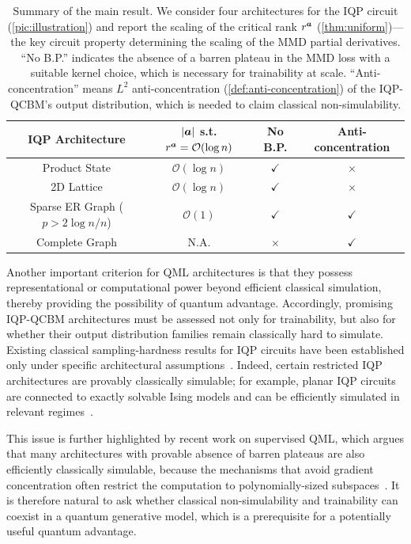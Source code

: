 \documentclass{article}
\theoremstyle{plain}
\theoremstyle{definition}
\theoremstyle{remark}
\begin{document}
\begin{table}
\centering
\caption{Summary of the main result. We consider four architectures for the IQP circuit (\cref{pic:illustration}) and report the scaling of the critical rank $r^{\bm{a}}$ (\cref{thm:uniform})---the key circuit property determining the scaling of the MMD partial derivatives. ``No B.P.'' indicates the absence of a barren plateau in the MMD loss with a suitable kernel choice, which is necessary for trainability at scale. ``Anti-concentration'' means $L^2$ anti-concentration (\cref{def:anti-concentration}) of the IQP-QCBM's output distribution, which is needed to claim classical non-simulability.}
\vspace{0.2cm}
\label{tab:examples-summary}
\begin{tabular}{cccc}
\toprule
IQP Architecture 
& $\abs{{\bm{a}}}$ s.t. $r^{\bm{a}} = \mathcal{O}(\log n)$
& No B.P.
& Anti-concentration \\
\midrule
Product State
& $\mathcal{O}(\log n)$
& $\checkmark$
& $\times$ \\

2D Lattice
& $\mathcal{O}(\log n)$
& $\checkmark$
& $\times$ \\

Sparse ER Graph ($p>2\log n /n$)
& $\mathcal{O}(1)$
& $\checkmark$
& $\checkmark$ \\

Complete Graph
& N.A.
& $\times$
& $\checkmark$ \\
\bottomrule
\end{tabular}
\vspace{-0.5cm}
\end{table}

Another important criterion for QML architectures is that they possess representational or computational power beyond efficient classical simulation, thereby providing the possibility of quantum advantage. Accordingly, promising IQP-QCBM architectures must be assessed not only for trainability, but also for whether their output distribution families remain classically hard to simulate. Existing classical sampling-hardness results for IQP circuits have been established only under specific architectural assumptions~\citep{Bremner10,Bremner16,Bremner17}. Indeed, certain restricted IQP architectures are provably classically simulable; for example, planar IQP circuits are connected to exactly solvable Ising models and can be efficiently simulated in relevant regimes~\citep{Fujii17}.

This issue is further highlighted by recent work on supervised QML, which argues that many architectures with provable absence of barren plateaus are also efficiently classically simulable, because the mechanisms that avoid gradient concentration often restrict the computation to polynomially-sized subspaces~\citep{Cerezo2025Simulability}.
It is therefore natural to ask whether classical non-simulability and trainability can coexist in a quantum generative model, which is a prerequisite for a potentially useful quantum advantage.
\end{document}
